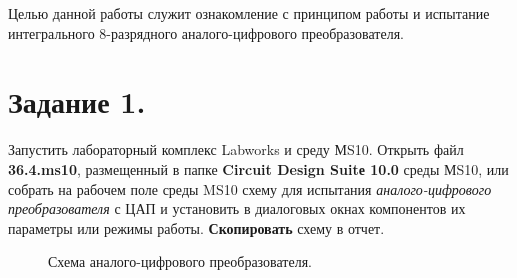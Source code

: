 \documentclass[spec, och, otchet, hidelinks]{SCWorks}
\begin{document}


\tableofcontents






\intro

Целью данной работы служит ознакомление с принципом работы и испытание интегрального 8-разрядного аналого-цифрового преобразователя.

\newpage

\section*{Задание 1.}
Запустить лабораторный комплекс Labworks и среду МS10. Открыть файл \textbf{36.4.ms10}, размещенный в папке \textbf{Circuit Design Suitе 10.0} среды 
МS10, или собрать на рабочем поле среды MS10 схему для испытания \textit{аналого-цифрового преобразователя} с ЦАП и установить в диалоговых окнах 
компонентов их параметры или режимы работы. \textbf{Скопировать} схему в отчет.

\begin{figure}[h]
	\caption{Схема аналого-цифрового преобразователя.}
\end{figure}
\end{document}
